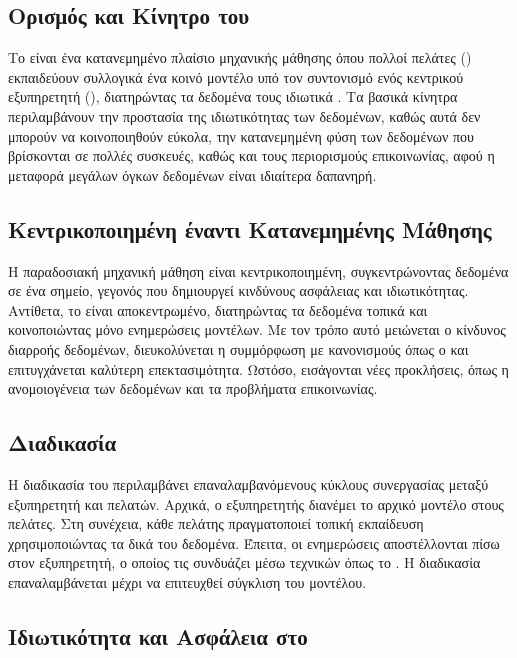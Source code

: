 \subsection{Ορισμός και Κίνητρο του }

Το  είναι ένα κατανεμημένο πλαίσιο μηχανικής μάθησης όπου πολλοί πελάτες () εκπαιδεύουν συλλογικά ένα κοινό μοντέλο υπό τον συντονισμό ενός κεντρικού εξυπηρετητή (), διατηρώντας τα δεδομένα τους ιδιωτικά \cite{mcmahan2017communication}. Τα βασικά κίνητρα περιλαμβάνουν την προστασία της ιδιωτικότητας των δεδομένων, καθώς αυτά δεν μπορούν να κοινοποιηθούν εύκολα, την κατανεμημένη φύση των δεδομένων που βρίσκονται σε πολλές συσκευές, καθώς και τους περιορισμούς επικοινωνίας, αφού η μεταφορά μεγάλων όγκων δεδομένων είναι ιδιαίτερα δαπανηρή.

\subsection{Κεντρικοποιημένη έναντι Κατανεμημένης Μάθησης}

Η παραδοσιακή μηχανική μάθηση είναι κεντρικοποιημένη, συγκεντρώνοντας δεδομένα σε ένα σημείο, γεγονός που δημιουργεί κινδύνους ασφάλειας και ιδιωτικότητας. Αντίθετα, το  είναι αποκεντρωμένο, διατηρώντας τα δεδομένα τοπικά και κοινοποιώντας μόνο ενημερώσεις μοντέλων. Με τον τρόπο αυτό μειώνεται ο κίνδυνος διαρροής δεδομένων, διευκολύνεται η συμμόρφωση με κανονισμούς όπως ο  και επιτυγχάνεται καλύτερη επεκτασιμότητα. Ωστόσο, εισάγονται νέες προκλήσεις, όπως η ανομοιογένεια των δεδομένων και τα προβλήματα επικοινωνίας.

\subsection{Διαδικασία }

Η διαδικασία του  περιλαμβάνει επαναλαμβανόμενους κύκλους συνεργασίας μεταξύ εξυπηρετητή και πελατών. Αρχικά, ο εξυπηρετητής διανέμει το αρχικό μοντέλο στους πελάτες. Στη συνέχεια, κάθε πελάτης πραγματοποιεί τοπική εκπαίδευση χρησιμοποιώντας τα δικά του δεδομένα. Έπειτα, οι ενημερώσεις αποστέλλονται πίσω στον εξυπηρετητή, ο οποίος τις συνδυάζει μέσω τεχνικών όπως το  \cite{mcmahan2017communication}. Η διαδικασία επαναλαμβάνεται μέχρι να επιτευχθεί σύγκλιση του μοντέλου.

\subsection{Ιδιωτικότητα και Ασφάλεια στο }

